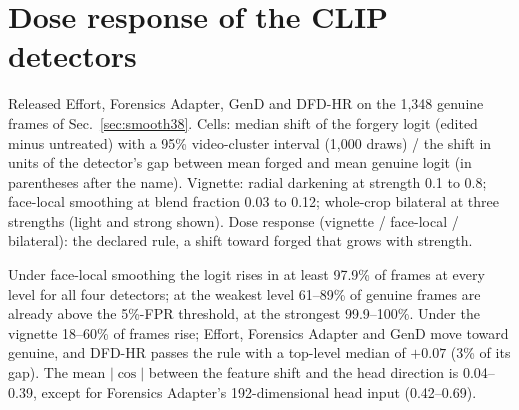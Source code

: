 \documentclass[10pt]{article}
\begin{document}
\section{Dose response of the CLIP detectors}
\label{sec:dose}
\begin{table}[H]
\centering
\caption{Released Effort, Forensics Adapter, GenD and DFD-HR on the 1,348 genuine frames of Sec.~\ref{sec:smooth38}. Cells: median
shift of the forgery logit (edited minus untreated) with a 95\% video-cluster interval (1,000 draws) / the shift in units of the
detector's gap between mean forged and mean genuine logit (in parentheses after the name). Vignette: radial darkening at strength
0.1 to 0.8; face-local smoothing at blend fraction 0.03 to 0.12; whole-crop bilateral at three strengths (light and strong shown).
Dose response (vignette / face-local / bilateral): the declared rule, a shift toward forged that grows with strength.}
\label{tab:dose}
\scriptsize
\begin{adjustbox}{max width=\linewidth}\end{adjustbox}
\end{table}
Under face-local smoothing the logit rises in at least 97.9\% of frames at every level for all four detectors; at the weakest level
61--89\% of genuine frames are already above the 5\%-FPR threshold, at the strongest 99.9--100\%. Under the vignette 18--60\% of
frames rise; Effort, Forensics Adapter and GenD move toward genuine, and DFD-HR passes the rule with a top-level median of $+0.07$
(3\% of its gap). The mean $|\cos|$ between the feature shift and the head direction is 0.04--0.39, except for Forensics Adapter's
192-dimensional head input (0.42--0.69).
\end{document}
